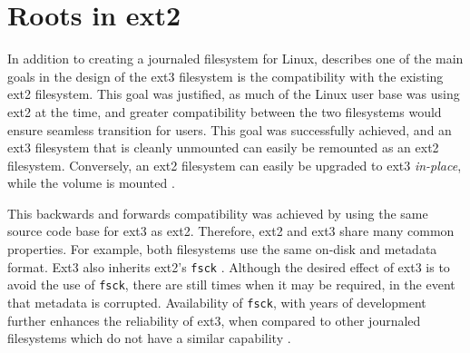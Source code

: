 \section{Roots in ext2}

In addition to creating a journaled filesystem for Linux, \citet{Tweedie2000} describes one of the main goals in the design of the ext3 filesystem is the compatibility with the existing ext2 filesystem. This goal was justified, as much of the Linux user base was using ext2 at the time, and greater compatibility between the two filesystems would ensure seamless transition for users. This goal was successfully achieved, and an ext3 filesystem that is cleanly unmounted can easily be remounted as an ext2 filesystem. Conversely, an ext2 filesystem can easily be upgraded to ext3 \emph{in-place}, while the volume is mounted \citep{Tweedie2000, Robbins2001, Bovet2006}.

This backwards and forwards compatibility was achieved by using the same source code base for ext3 as ext2. Therefore, ext2 and ext3 share many common properties. For example, both filesystems use the same on-disk and metadata format. Ext3 also inherits ext2's \texttt{fsck} \citep{Robbins2001a, Tweedie2000}. Although the desired effect of ext3 is to avoid the use of \texttt{fsck}, there are still times when it may be required, in the event that metadata is corrupted. Availability of \texttt{fsck}, with years of development further enhances the reliability of ext3, when compared to other journaled filesystems which do not have a similar capability \citep{Robbins2001a}.